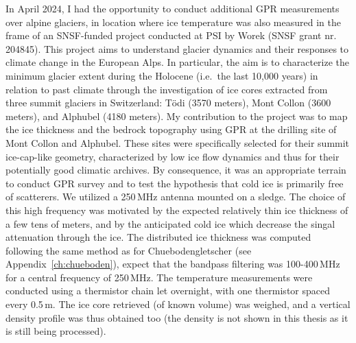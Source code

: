 In April 2024, I had the opportunity to conduct additional GPR measurements over alpine glaciers, in location where ice temperature was also measured in the frame of an SNSF-funded project conducted at PSI by Worek (SNSF grant nr. 204845). This project aims to understand glacier dynamics and their responses to climate change in the European Alps. In particular, the aim is to characterize the minimum glacier extent during the Holocene (i.e.\ the last 10,000 years) in relation to past climate through the investigation of ice cores extracted from three summit glaciers in Switzerland: Tödi (3570 meters), Mont Collon (3600 meters), and Alphubel (4180 meters). My contribution to the project was to map the ice thickness and the bedrock topography using GPR at the drilling site of Mont Collon and Alphubel. These sites were specifically selected for their summit ice-cap-like geometry, characterized by low ice flow dynamics and thus for their potentially good climatic archives. By consequence, it was an appropriate terrain to conduct GPR survey and to test the hypothesis that cold ice is primarily free of scatterers. We utilized a 250\,MHz antenna mounted on a sledge. The choice of this high frequency was motivated by the expected relatively thin ice thickness of a few tens of meters, and by the anticipated cold ice which decrease the singal attenuation through the ice. The distributed ice thickness was computed following the same method as for Chuebodengletscher (see Appendix~\ref{ch:chueboden}), expect that the bandpass filtering was 100-400\,MHz for a central frequency of 250\,MHz. The temperature measurements were conducted using a thermistor chain let overnight, with one thermistor spaced every 0.5\,m. The ice core retrieved (of known volume) was weighed, and a vertical density profile was thus obtained too (the density is not shown in this thesis as it is still being processed).

